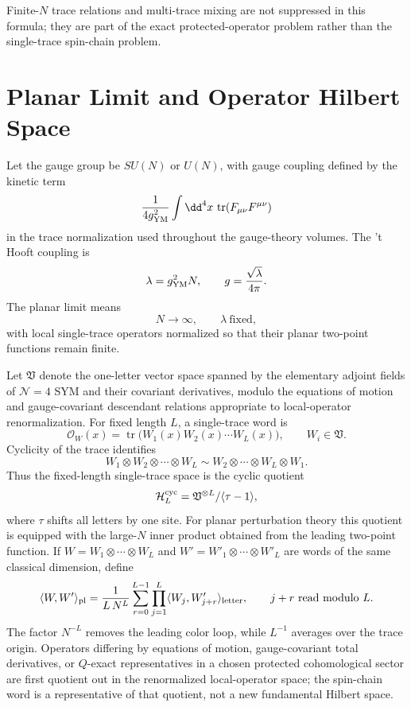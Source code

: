 Finite-\(N\) trace relations and multi-trace mixing are not suppressed in
this formula; they are part of the exact protected-operator problem rather
than the single-trace spin-chain problem.

\section{Planar Limit and Operator Hilbert Space}

Let the gauge group be \(SU(N)\) or \(U(N)\), with gauge coupling defined by
the kinetic term
\[
  \frac{1}{4g_{\rm YM}^2}\int \dd^4x\,
  \operatorname{tr}(F_{\mu\nu}F^{\mu\nu})
\]
in the trace normalization used throughout the gauge-theory volumes.  The
't Hooft coupling is
\[
  \lambda=g_{\rm YM}^2N,\qquad
  g=\frac{\sqrt\lambda}{4\pi}.
\]
The planar limit means
\[
  N\to\infty,\qquad \lambda\ \text{fixed},
\]
with local single-trace operators normalized so that their planar two-point
functions remain finite.

Let \(\mathfrak V\) denote the one-letter vector space spanned by the
elementary adjoint fields of \(\mathcal N=4\) SYM and their covariant
derivatives, modulo the equations of motion and gauge-covariant descendant
relations appropriate to local-operator renormalization.  For fixed length
\(L\), a single-trace word is
\[
  \mathcal O_W(x)
  =
  \operatorname{tr}\!\bigl(W_1(x)W_2(x)\cdots W_L(x)\bigr),
  \qquad W_i\in\mathfrak V .
\]
Cyclicity of the trace identifies
\[
  W_1\otimes W_2\otimes\cdots\otimes W_L
  \sim
  W_2\otimes\cdots\otimes W_L\otimes W_1 .
\]
Thus the fixed-length single-trace space is the cyclic quotient
\[
  \mathcal H_L^{\rm cyc}
  =
  \mathfrak V^{\otimes L}/\langle\tau-1\rangle ,
\]
where \(\tau\) shifts all letters by one site.
For planar perturbation theory this quotient is equipped with the large-\(N\)
inner product obtained from the leading two-point function.  If
\(W=W_1\otimes\cdots\otimes W_L\) and \(W'=W'_1\otimes\cdots\otimes W'_L\)
are words of the same classical dimension, define
\[
  \langle W,W'\rangle_{\rm pl}
  =
  \frac{1}{L\,N^L}
  \sum_{r=0}^{L-1}
  \prod_{j=1}^{L}
  \langle W_j,W'_{j+r}\rangle_{\rm letter},
  \qquad j+r\ {\rm read\ modulo}\ L .
\]
The factor \(N^{-L}\) removes the leading color loop, while \(L^{-1}\)
averages over the trace origin.  Operators differing by equations of motion,
gauge-covariant total derivatives, or \(Q\)-exact representatives in a
chosen protected cohomological sector are first quotient out in the
renormalized local-operator space; the spin-chain word is a representative of
that quotient, not a new fundamental Hilbert space.

